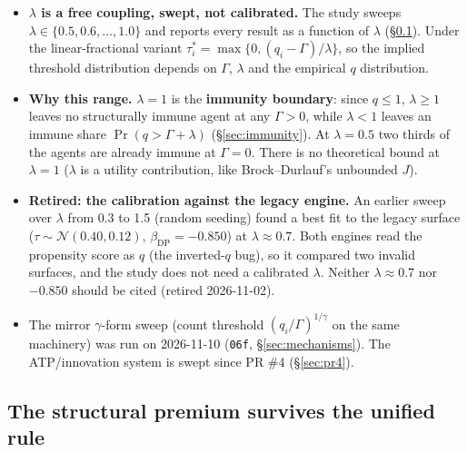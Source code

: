 \documentclass[11pt,a4paper]{article}
\newcommand{\code}[1]{\texttt{#1}}
\begin{document}
\begin{itemize}
  \item \textbf{$\lambda$ is a free coupling, swept, not calibrated.} The study sweeps $\lambda \in \{0.5, 0.6,
    \dots, 1.0\}$ and reports every result as a function of $\lambda$
    (\S\ref{sec:premiumresult}). Under the linear-fractional variant
    $\tau_i^{*} = \max\{0, (q_i - \Gamma)/\lambda\}$, so the implied threshold
    distribution depends on $\Gamma$, $\lambda$ and the empirical $q$ distribution.
  \item \textbf{Why this range.} $\lambda = 1$ is the \textbf{immunity boundary}: since
    $q \le 1$, $\lambda \ge 1$ leaves no structurally immune agent at any $\Gamma > 0$,
    while $\lambda < 1$ leaves an immune share $\Pr(q > \Gamma + \lambda)$
    (\S\ref{sec:immunity}). At $\lambda = 0.5$ two thirds of the agents are already
    immune at $\Gamma = 0$. There is no theoretical bound at $\lambda = 1$ ($\lambda$ is a utility
    contribution, like Brock--Durlauf's unbounded $J$).
  \item \textbf{Retired: the calibration against the legacy engine.} An earlier sweep over
    $\lambda$ from 0.3 to 1.5 (random seeding) found a best fit to the legacy surface ($\tau \sim \mathcal{N}(0.40, 0.12)$, $\beta_{\text{DP}} = -0.850$) at
    $\lambda \approx 0.7$. Both engines read the propensity score as $q$ (the inverted-$q$
    bug), so it compared two invalid surfaces, and the study does not need a calibrated
    $\lambda$. Neither $\lambda \approx 0.7$ nor $-0.850$ should be cited (retired
    2026-11-02).
  \item The mirror $\gamma$-form sweep (count threshold $(q_i/\Gamma)^{1/\gamma}$ on the
    same machinery) was run on 2026-11-10 (\code{06f}, \S\ref{sec:mechanisms}). The
    ATP/innovation system is swept since PR \#4 (\S\ref{sec:pr4}).
\end{itemize}

\subsection{The structural premium survives the unified rule}
\label{sec:premiumresult}

\noindent{}
\medskip
\end{document}

